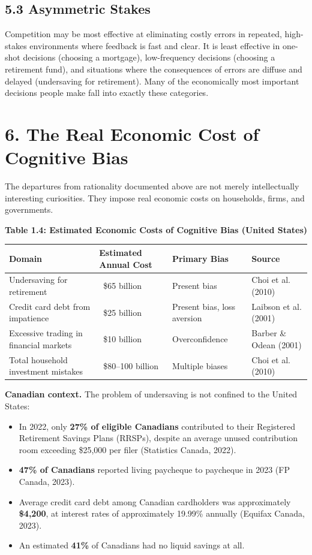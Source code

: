 \documentclass[12pt, letterpaper]{article}
\begin{document}
\subsection{5.3 Asymmetric Stakes}


Competition may be most effective at eliminating costly errors in repeated, high-stakes environments where feedback is fast and clear. It is least effective in one-shot decisions (choosing a mortgage), low-frequency decisions (choosing a retirement fund), and situations where the consequences of errors are diffuse and delayed (undersaving for retirement). Many of the economically most important decisions people make fall into exactly these categories.

\medskip


\section{6. The Real Economic Cost of Cognitive Bias}


The departures from rationality documented above are not merely intellectually interesting curiosities. They impose real economic costs on households, firms, and governments.

\textbf{Table 1.4: Estimated Economic Costs of Cognitive Bias (United States)}


\begin{table}[H]
\centering
\small
\begin{tabularx}{\linewidth}{lYYY}
\toprule
Domain & Estimated Annual Cost & Primary Bias & Source \\
\midrule
Undersaving for retirement & ~\$65 billion & Present bias & Choi et al. (2010) \\
Credit card debt from impatience & ~\$25 billion & Present bias, loss aversion & Laibson et al. (2001) \\
Excessive trading in financial markets & ~\$10 billion & Overconfidence & Barber \& Odean (2001) \\
Total household investment mistakes & ~\$80--100 billion & Multiple biases & Choi et al. (2010) \\
\bottomrule
\end{tabularx}
\end{table}


\textbf{Canadian context.} The problem of undersaving is not confined to the United States:
\begin{itemize}
\item In 2022, only \textbf{27\% of eligible Canadians} contributed to their Registered Retirement Savings Plans (RRSPs), despite an average unused contribution room exceeding \$25,000 per filer (Statistics Canada, 2022).
\item \textbf{47\% of Canadians} reported living paycheque to paycheque in 2023 (FP Canada, 2023).
\item Average credit card debt among Canadian cardholders was approximately \textbf{\$4,200}, at interest rates of approximately 19.99\% annually (Equifax Canada, 2023).
\item An estimated \textbf{41\%} of Canadians had no liquid savings at all.
\end{itemize}
\end{document}

